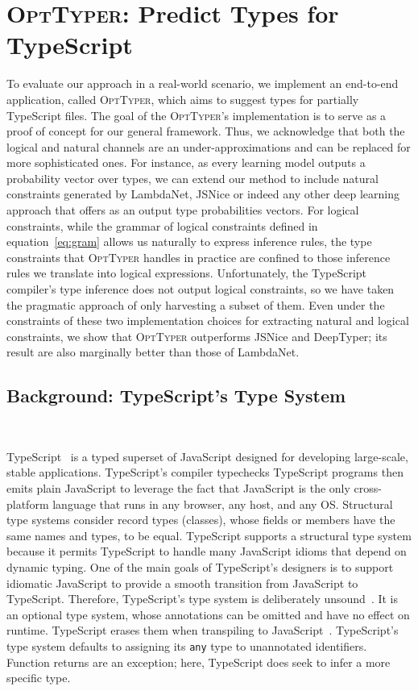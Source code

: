 \documentclass[acmsmall, review, anonymous]{acmart}\settopmatter{printfolios=true,printccs=false,printacmref=false}
\newcommand{\projectname}{\textsc{OptTyper}\xspace}
\begin{document}
\section{\projectname: Predict Types for TypeScript}
\label{sec:prodts}
To evaluate our approach in a real-world scenario, we
implement an end-to-end application, called \projectname, which aims
to suggest types for partially TypeScript files. The goal of the
\projectname{}'s implementation 
is to serve as a proof of concept for our general framework. Thus, we acknowledge that both the
logical and natural channels are an under-approximations and can be replaced for more
sophisticated ones. For instance, as every learning model outputs a probability vector
over types, we can extend our method to include natural constraints generated by LambdaNet, JSNice or indeed any other deep learning approach that offers as an output type probabilities vectors. 
For logical constraints, while
the grammar of logical constraints defined
in equation~\eqref{eq:gram} allows us naturally to express inference rules, the type constraints that \projectname handles in practice are confined to  
those inference rules we translate into logical expressions. 
Unfortunately, the TypeScript compiler's type inference does not output logical constraints, so we 
have taken the pragmatic approach of only 
harvesting a subset of them. 
Even under the constraints of these two implementation choices for extracting natural and logical constraints, we show that \projectname outperforms JSNice and DeepTyper; its result are also marginally better than those of LambdaNet.

\subsection{Background: TypeScript's Type System}~\label{ssec:intro-typescript}

TypeScript~\citep{typescript} is a typed superset of
JavaScript designed for developing large-scale, stable applications.
TypeScript's compiler typechecks TypeScript programs then emits plain JavaScript
to leverage the fact that JavaScript is the only cross-platform
language that runs in any browser, any host, and any OS.
Structural type systems consider record types (classes), whose fields or members have the same names and types, to be equal.
TypeScript supports a
structural type system because it permits TypeScript to handle many JavaScript idioms that depend on dynamic typing.
One of the main goals of TypeScript's designers is to support idiomatic
JavaScript to
provide a smooth transition from JavaScript to TypeScript.
%
Therefore, TypeScript's type system is deliberately
unsound~\citep{understandtypescript}.  It is an optional type system, whose
annotations can be omitted and have no effect on runtime.  TypeScript erases 
them when transpiling to JavaScript~\citep{understandtypescript}.
TypeScript's type system defaults to assigning its \texttt{any} type to
unannotated identifiers.  Function returns are an exception;
here, TypeScript does seek to infer a more specific type.
\end{document}
